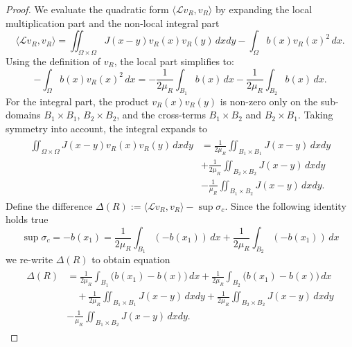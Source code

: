 \documentclass[11pt, a4paper]{article}
\theoremstyle{break}
\theoremstyle{break}
\theoremstyle{break}
\theoremstyle{break}
\theoremstyle{break}
\theoremstyle{break}
\theoremstyle{break}
\theoremstyle{break}
\theoremstyle{break}
\begin{document}
\begin{proof}
We evaluate the quadratic form $\langle \mathcal{L}v_R, v_R \rangle$ by expanding the local multiplication part and the non-local integral part
\begin{equation}
    \langle \mathcal{L}v_R, v_R \rangle = \iint_{\Omega \times \Omega} J(x-y)v_R(x)v_R(y) \, dx dy - \int_\Omega b(x) v_R(x)^2 \, dx.
\end{equation}
Using the definition of $v_R$, the local part simplifies to:
\begin{equation}
    - \int_\Omega b(x) v_R(x)^2 \, dx = - \frac{1}{2\mu_R} \int_{B_1} b(x) \, dx - \frac{1}{2\mu_R} \int_{B_2} b(x) \, dx.
\end{equation}
For the integral part, the product $v_R(x)v_R(y)$ is non-zero only on the sub-domains $B_1 \times B_1$, $B_2 \times B_2$, and the cross-terms $B_1 \times B_2$ and $B_2 \times B_1$. Taking symmetry into account, the integral expands to
\begin{align}
    \begin{split}
        \iint_{\Omega \times \Omega} J(x-y)v_R(x)v_R(y) \, dx dy 
        &=
        \frac{1}{2\mu_R} \iint_{B_1 \times B_1} J(x-y) \, dx dy \\
        &+ \frac{1}{2\mu_R} \iint_{B_2 \times B_2} J(x-y) \, dx dy \\
        &- \frac{1}{\mu_R} \iint_{B_1 \times B_2} J(x-y) \, dx dy.
    \end{split}
\end{align}
Define the difference $\Delta(R) := \langle \mathcal{L}v_R, v_R \rangle - \sup \sigma_c$. Since the following identity holds true
\begin{equation}
    \sup \sigma_c = -b(x_1) = \frac{1}{2\mu_R} \int_{B_1} (-b(x_1)) \, dx + \frac{1}{2\mu_R} \int_{B_2} (-b(x_1)) \, dx
\end{equation}
we re-write $\Delta(R)$ to obtain equation
\begin{align}
    \begin{split}
        \label{eq:delta_R_exact}
        \Delta(R) 
        &= \frac{1}{2\mu_R} \int_{B_1} \big( b(x_1) - b(x) \big) \, dx + \frac{1}{2\mu_R} \int_{B_2} \big( b(x_1) - b(x) \big) \, dx \nonumber \\
        &\quad + \frac{1}{2\mu_R} \iint_{B_1 \times B_1} J(x-y) \, dx dy + \frac{1}{2\mu_R} \iint_{B_2 \times B_2} J(x-y) \, dx dy \\
        &- \frac{1}{\mu_R} \iint_{B_1 \times B_2} J(x-y) \, dx dy.
    \end{split}
\end{align}

\end{proof}
\end{document}
